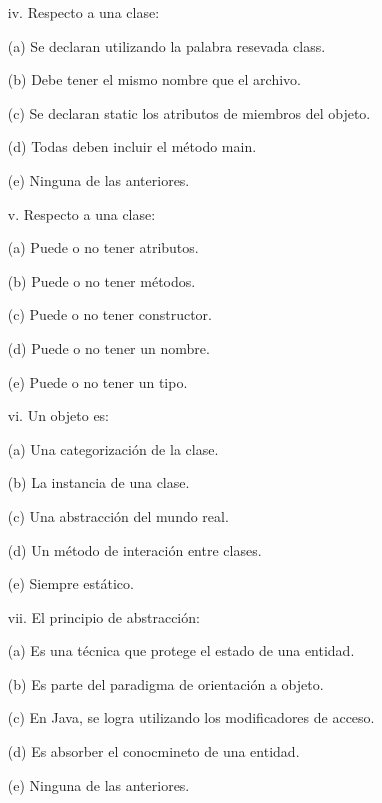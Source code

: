 \documentclass[10pt]{article}
\begin{document}
\begin{enumerate}
{\begin{multicols}{2}
    \begin{enumerate}[label=(\alph*)]
        \item[iv.] Respecto a una clase:
        \item[(a)] Se declaran utilizando la palabra resevada class.
        \item[(b)] Debe tener el mismo nombre que el archivo.
        \item[(c)] Se declaran static los atributos de miembros del objeto.
        \item[(d)] Todas deben incluir el m\'etodo main.
        \item[(e)] Ninguna de las anteriores.
    \end{enumerate}

    \begin{enumerate}[label=(\alph*)]
        \item[v.] Respecto a una clase:
        \item[(a)] Puede o no tener atributos.
        \item[(b)] Puede o no tener m\'etodos.
        \item[(c)] Puede o no tener constructor.
        \item[(d)] Puede o no tener un nombre.
        \item[(e)] Puede o no tener un tipo.
    \end{enumerate}
    
    \begin{enumerate}[label=(\alph*)]
        \item[vi.] Un objeto es: 
        \item[(a)] Una categorizaci\'on de la clase.
        \item[(b)] La instancia de una clase.
        \item[(c)] Una abstracci\'on del mundo real.        
        \item[(d)] Un m\'etodo de interaci\'on entre clases. 
        \item[(e)] Siempre est\'atico.
    \end{enumerate}

    \begin{enumerate}[label=(\alph*)]
        \item[vii.] El principio de abstracci\'on: 
        \item[(a)] Es una t\'ecnica que protege el estado de una entidad.
        \item[(b)] Es parte del paradigma de orientaci\'on a objeto.
        \item[(c)] En Java, se logra utilizando los modificadores de acceso.
        \item[(d)] Es absorber el conocmineto de una entidad.
        \item[(e)] Ninguna de las anteriores.
    \end{enumerate}


\end{multicols}}
\end{enumerate}
\end{document}
